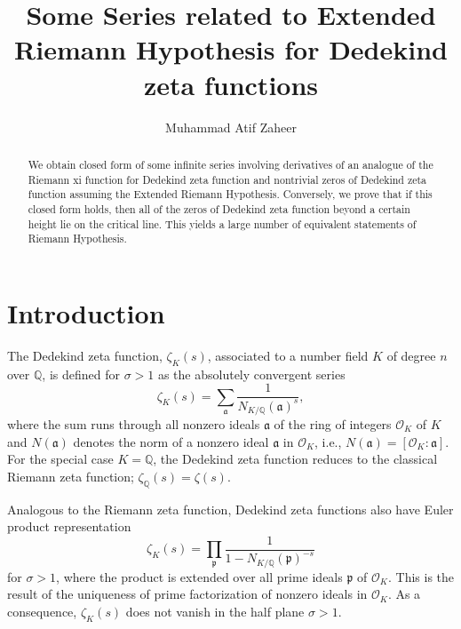 \documentclass[12pt]{amsart}
\title{Some Series related to Extended Riemann Hypothesis for Dedekind zeta functions}
\author{Muhammad Atif Zaheer}
\date{}
\numberwithin{equation}{section}
\theoremstyle{myplain}
\theoremstyle{mydefinition}
\theoremstyle{plain}
\theoremstyle{definition}
\def\Q{{\mathbb Q}}
\begin{document}
\begin{abstract}
We obtain closed form of some infinite series involving derivatives of an analogue of the Riemann xi function for Dedekind zeta function and nontrivial zeros of Dedekind zeta function assuming the Extended Riemann Hypothesis. Conversely, we prove that if this closed form holds, then all of the zeros of Dedekind zeta function beyond a certain height lie on the critical line. This yields a large number of equivalent statements of Riemann Hypothesis.

\end{abstract}


\maketitle


\section{Introduction}

The Dedekind zeta function, $\zeta_K(s)$, associated to a number field $K$ of degree $n$ over $\Q$, is defined for $\sigma > 1$ as the absolutely convergent series
\[
\zeta_K(s) = \sum_{\mathfrak{a}} \frac{1}{N_{K/\Q}(\mathfrak{a})^s},
\]
where the sum runs through all nonzero ideals $\mathfrak{a}$ of the ring of integers $\mathcal{O}_K$ of $K$ and $N(\mathfrak{a})$ denotes the norm of a nonzero ideal $\mathfrak{a}$ in $\mathcal{O}_K$, i.e., $N(\mathfrak{a}) = [\mathcal{O}_K : \mathfrak{a}]$. For the special case $K = \mathbb{Q}$,  the Dedekind zeta function reduces to the classical Riemann zeta function; $\zeta_{\mathbb{Q}}(s) = \zeta(s)$.

Analogous to the Riemann zeta function, Dedekind zeta functions also have Euler product representation
\begin{equation} \label{euler product}
\zeta_K(s) = \prod_{\mathfrak{p}}  \frac{1}{1 - N_{K/\Q}(\mathfrak{p})^{-s}}
\end{equation}
for $\sigma >1$, where the product is extended over all prime ideals $\mathfrak{p}$ of $\mathcal{O}_K$. This is the result of the uniqueness of prime factorization of nonzero ideals in $\mathcal{O}_K$. As a consequence, $\zeta_K(s)$ does not vanish in the half plane $\sigma > 1$.
\end{document}
